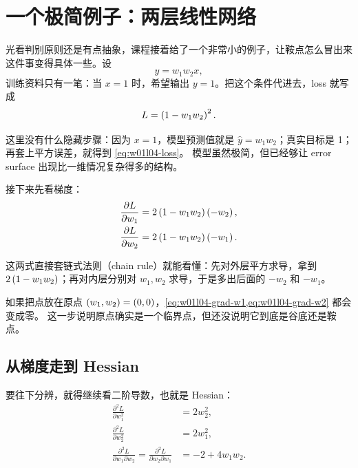 \documentclass[main.tex]{subfiles}
\begin{document}
\section{一个极简例子：两层线性网络}
\label{sec:w01l04-simple-network}

光看判别原则还是有点抽象，课程接着给了一个非常小的例子，让鞍点怎么冒出来这件事变得具体一些。设
\begin{equation}
  y = w_1 w_2 x,
  \label{eq:w01l04-model}
\end{equation}
训练资料只有一笔：当 $x=1$ 时，希望输出 $y=1$。把这个条件代进去，loss 就写成
\begin{equation}
  L = \left( 1-w_1w_2 \right)^2.
  \label{eq:w01l04-loss}
\end{equation}

这里没有什么隐藏步骤：因为 $x=1$，模型预测值就是 $\hat{y}=w_1w_2$；真实目标是 1；再套上平方误差，就得到 \cref{eq:w01l04-loss}。
模型虽然极简，但已经够让 error surface 出现比一维情况复杂得多的结构。

接下来先看梯度：
\begin{align}
  \frac{\partial L}{\partial w_1} &= 2\left( 1-w_1w_2 \right)\left( -w_2 \right), \label{eq:w01l04-grad-w1} \\
  \frac{\partial L}{\partial w_2} &= 2\left( 1-w_1w_2 \right)\left( -w_1 \right). \label{eq:w01l04-grad-w2}
\end{align}

这两式直接套链式法则（chain rule）就能看懂：先对外层平方求导，拿到 $2\left( 1-w_1w_2 \right)$；再对内层分别对 $w_1,w_2$ 求导，于是多出后面的 $-w_2$ 和 $-w_1$。

如果把点放在原点 $\left( w_1,w_2 \right)=\left( 0,0 \right)$，\cref{eq:w01l04-grad-w1,eq:w01l04-grad-w2} 都会变成零。
这一步说明原点确实是一个临界点，但还没说明它到底是谷底还是鞍点。

\subsection{从梯度走到 Hessian}
\label{sec:w01l04-gradient-to-hessian}

要往下分辨，就得继续看二阶导数，也就是 Hessian：
\begin{align*}
  \frac{\partial^2 L}{\partial w_1^2} &= 2w_2^2, \\
  \frac{\partial^2 L}{\partial w_2^2} &= 2w_1^2, \\
  \frac{\partial^2 L}{\partial w_1 \partial w_2}
  = \frac{\partial^2 L}{\partial w_2 \partial w_1}
  &= -2 + 4w_1w_2.
\end{align*}
\end{document}
